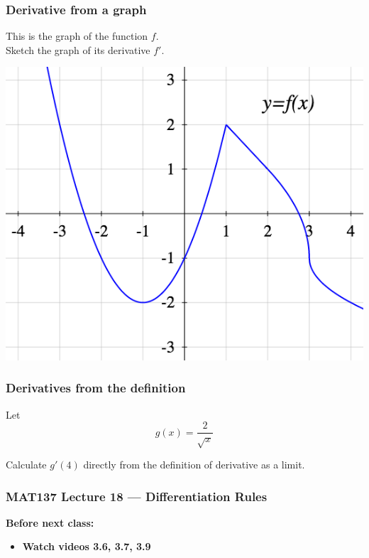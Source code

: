 \documentclass[14pt]{beamer}
\newcommand {\DS} [1] {${\displaystyle #1}$}
\begin{document}
\begin{frame}[t]
\frametitle{Derivative from a graph}
This is the graph of the function $f$.  \\
Sketch the graph of its derivative $f'$.
\begin{center}
\includegraphics[scale=.4]{G4}
\end{center}

\end{frame}
\begin{frame}[t]
\frametitle{Derivatives from the definition}

Let 
	$$g(x) = \frac{2}{\sqrt{x}} $$
	
Calculate \DS{g'(4)} directly from the definition of derivative as a limit.

\end{frame}




\begin{frame}
	\frametitle{MAT137 Lecture 18 --- Differentiation Rules}

	\vfill
	{\bf Before next class:}
		\begin{itemize} \normalsize
			\item {\bf Watch videos 3.6, 3.7, 3.9 }
		\end{itemize}
\end{frame}
\end{document}
